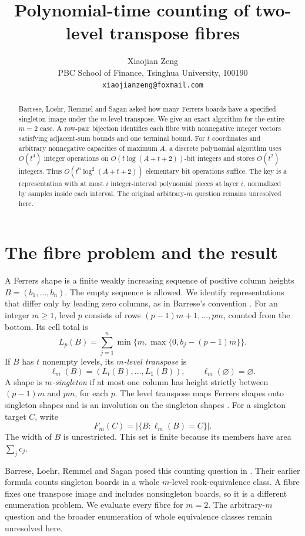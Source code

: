 \documentclass[11pt]{article}
\title{Polynomial-time counting of two-level transpose fibres}
\author{Xiaojian Zeng\\[3pt]
\small PBC School of Finance, Tsinghua University, 100190\\
\small\texttt{xiaojianzeng@foxmail.com}}
\date{}
\theoremstyle{remark}
\newcommand{\card}[1]{\lvert #1\rvert}
\begin{document}
\maketitle
\begin{abstract}
Barrese, Loehr, Remmel and Sagan asked how many Ferrers boards have a
specified singleton image under the $m$-level transpose. We give an exact
algorithm for the entire $m=2$ case. A row-pair bijection identifies each
fibre with nonnegative integer vectors satisfying adjacent-sum bounds and
one terminal bound. For $t$ coordinates and arbitrary nonnegative
capacities of maximum $A$, a discrete polynomial algorithm uses $O(t^4)$
integer operations on $O(t\log(A+t+2))$-bit integers and stores $O(t^2)$
integers. Thus $O(t^6\log^2(A+t+2))$ elementary bit operations suffice.
The key is a representation with at most $i$ integer-interval polynomial
pieces at layer $i$, normalized by samples inside each interval.
The original arbitrary-$m$ question remains unresolved here.
\end{abstract}

\section{The fibre problem and the result}

A Ferrers shape is a finite weakly increasing sequence of positive
column heights $B=(b_1,\ldots,b_n)$. The empty sequence is allowed.
We identify representations that differ only by leading zero columns,
as in Barrese's convention \cite[Section~3]{Barrese2021}.
For an integer $m\geq1$, level $p$ consists of rows
$(p-1)m+1,\ldots,pm$, counted from the bottom. Its cell total is
\[
 L_p(B)=\sum_{j=1}^n\min\{m,\max\{0,b_j-(p-1)m\}\}.
\]
If $B$ has $t$ nonempty levels, its \emph{$m$-level transpose} is
\[
 \ell_m(B)=(L_t(B),\ldots,L_1(B)),
 \qquad \ell_m(\varnothing)=\varnothing.
\]
A shape is \emph{$m$-singleton} if at most one column has height strictly
between $(p-1)m$ and $pm$, for each $p$. The level transpose maps Ferrers
shapes onto singleton shapes and is an involution on the singleton
shapes \cite[Definition~4 and the following paragraph]{BLRS2016}.
For a singleton target $C$, write
\[
 F_m(C)=\card{\{B:\ell_m(B)=C\}}.
\]
The width of $B$ is unrestricted. This set is finite because its members
have area $\sum_j c_j$.

Barrese, Loehr, Remmel and Sagan posed this counting question in
\cite[Section~6.2, p.~33]{BLRS2016}. Their earlier formula
\cite[Theorem~5.2]{BLRS2014} counts singleton boards in a whole
$m$-level rook-equivalence class. A fibre fixes one transpose image and
includes nonsingleton boards, so it is a different enumeration problem.
We evaluate every fibre for $m=2$. The arbitrary-$m$ question and the
broader enumeration of whole equivalence classes remain unresolved here.
\end{document}
